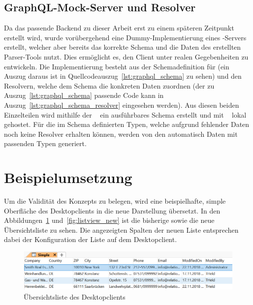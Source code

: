 \subsection{GraphQL-Mock-Server und Resolver}
Da das passende Backend zu dieser Arbeit erst zu einem späteren Zeitpunkt erstellt wird, wurde vorübergehend eine Dummy-Implementierung eines -Servers erstellt, welcher aber bereits das korrekte Schema und die Daten des erstellten Parser-Tools nutzt. Dies ermöglicht es, den Client unter realen Gegebenheiten zu entwickeln. Die Implementierung besteht aus der Schemadefinition für  (ein Auszug daraus ist in Quellcodeauszug~\ref{lst:graphql_schema} zu sehen) und den Resolvern, welche dem Schema die konkreten Daten zuordnen (der zu Auszug~\ref{lst:graphql_schema} passende Code kann in Auszug~\ref{lst:graphql_schema_resolver} eingesehen werden). Aus diesen beiden Einzelteilen wird mithilfe der ~\parencite*{apollo_graphql-tools_2019} ein ausführbares Schema erstellt und mit ~\parencite{express_graphql_2018} lokal gehostet. Für die im Schema definierten Typen, welche aufgrund fehlender Daten noch keine Resolver erhalten können, werden von den  automatisch Daten mit passenden Typen generiert.





\section{Beispielumsetzung}
Um die Validität des Konzepts zu belegen, wird eine beispielhafte, simple Oberfläche des  Desktopclients in die neue Darstellung übersetzt. In den Abbildungen~\ref{fig:listview_crm} und~\ref{fig:listview_new} ist die bisherige sowie die neue Übersichtsliste zu sehen. Die angezeigten Spalten der neuen Liste entsprechen dabei der Konfiguration der Liste auf dem Desktopclient. 

\begin{figure}[htb]
    \centering
    \captionsetup{justification=centering}
    \includegraphics[width=\textwidth]{figures/listview_crm.png}
        \caption{Übersichtsliste des Desktopclients}\label{fig:listview_crm}
\end{figure}

